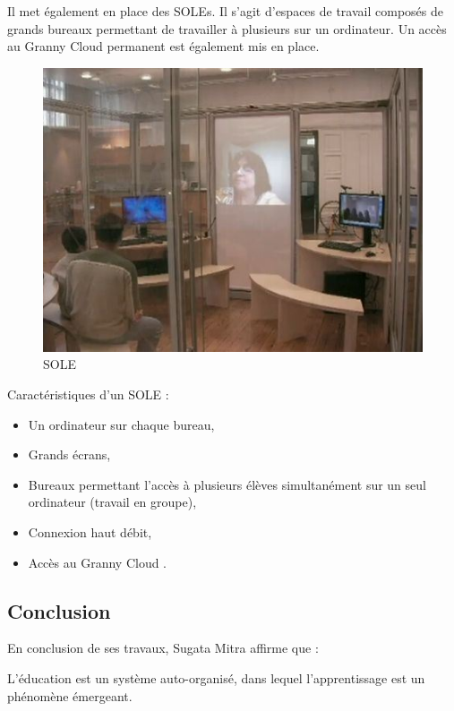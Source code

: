 Il met également en place des \gls{SOLE}s. Il s'agit d'espaces de travail composés de grands bureaux permettant de travailler à plusieurs sur un ordinateur. Un accès au \og Granny Cloud \fg{} permanent est également mis en place.

\begin{figure}[H]
  \includegraphics[width=\textwidth]{../resources/illustrations/soles}
  \caption{\gls{SOLE}}
\end{figure}

Caractéristiques d'un \gls{SOLE} :

\begin{itemize}
  \item Un ordinateur sur chaque bureau,
  \item Grands écrans,
  \item Bureaux permettant l'accès à plusieurs élèves simultanément sur un seul ordinateur (travail en groupe),
  \item Connexion haut débit,
  \item Accès au \og Granny Cloud \fg{}.
\end{itemize}

\subsection{Conclusion}
En conclusion de ses travaux, Sugata Mitra affirme que :

\begin{coolquote}
  L'éducation est un système auto-organisé, dans lequel l'apprentissage est un phénomène émergeant.
\end{coolquote}

